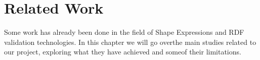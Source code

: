 \setchapterpreamble[u]{\margintoc}
\chapter{Related Work}

Some work has already been done in the field of Shape Expressions and RDF validation technologies. In this chapter we will go overthe main studies related to our project, exploring what they have achieved and someof their limitations.



